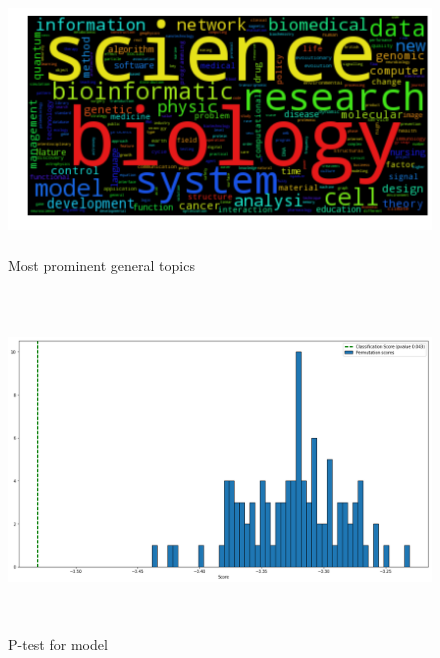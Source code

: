 \documentclass[a4paper, 11pt]{article}
\begin{document}
\begin{figure}[h]
    \centering
    \includegraphics[width=16cm,height=7cm]{visual-gen}
    \caption{Most prominent general topics}
    \label{fig:topic}
\end{figure}
\begin{figure}[h]
    \centering
    \includegraphics[width=16cm,height=9cm]{permutation_test}
    \caption{P-test for model}
    \label{fig:ptest}
\end{figure}
\end{document}
